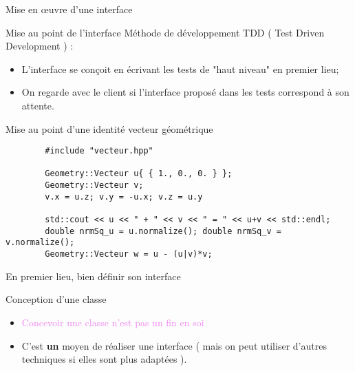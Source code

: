 \documentclass[compress,10pt,aspectratio=169]{beamer}
\begin{document}
    \begin{frame}[fragile]{Mise en {\oe}uvre d'une interface}
        \scriptsize
        \begin{exampleblock}{\small Mise au point de l'interface}
        Méthode de développement TDD ( Test Driven Development ) :
        \begin{itemize}
        \item L'interface se conçoit en écrivant les tests de "haut niveau" en premier lieu;
        \item On regarde avec le client si l'interface proposé dans les tests correspond à son attente.
        \end{itemize}
        \end{exampleblock}
      
        \begin{block}{\small Mise au point d'une identité vecteur géométrique}
        \begin{verbatim}
        #include "vecteur.hpp"
        
        Geometry::Vecteur u{ { 1., 0., 0. } };
        Geometry::Vecteur v;
        v.x = u.z; v.y = -u.x; v.z = u.y
        
        std::cout << u << " + " << v << " = " << u+v << std::endl;
        double nrmSq_u = u.normalize(); double nrmSq_v = v.normalize();
        Geometry::Vecteur w = u - (u|v)*v;
        \end{verbatim}
        \alert{En premier lieu, bien définir son interface}
        \end{block}
        
        \begin{block}{\small Conception d'une classe}
        \begin{itemize}
        \item \textcolor{violet}{Concevoir une classe n'est pas un fin en soi}
        \item C'est \textbf{un} moyen de réaliser une interface ( mais on peut utiliser d'autres techniques si elles sont plus adaptées ).
        \end{itemize}
        \end{block}
        
\end{frame}
      
\end{document}
